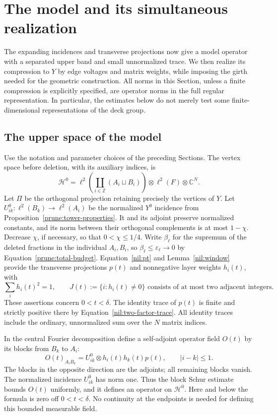 \section{The model and its simultaneous realization}
\label{sam:section}

The expanding incidences and transverse projections now give a model
operator with a separated upper band and small unnormalized trace.
We then realize its compression to \(Y\) by edge voltages and matrix
weights, while imposing the girth needed for the geometric construction.
All norms in this Section, unless a finite compression is explicitly
specified, are operator norms in the full regular representation.  In
particular, the estimates below do not merely test some finite-dimensional
representations of the deck group.

\subsection{The upper space of the model}

Use the notation and parameter choices of the preceding Sections.  The
vertex space before deletion, with its auxiliary indices, is
\[
 \mathcal H^0=
 \ell^2\!\left(\coprod_{i\in\mathbb Z}(A_i\sqcup B_i)\right)
 \otimes\ell^2(F)\otimes\mathbb C^N.
\]
Let \(\Pi\) be the orthogonal projection retaining precisely the vertices
of \(Y\).  Let \(U^0_{ik}:\ell^2(B_k)\to\ell^2(A_i)\) be the
normalized \(Y^0\) incidence from Proposition~\ref{prune:tower-properties}.
It and its adjoint preserve normalized constants, and its norm between
their orthogonal complements is at most \(1-\chi\). Decrease \(\chi\),
if necessary, so that \(0<\chi\le1/4\). Write \(\beta_\ell\) for the
supremum of the deleted fractions in the individual \(A_i,B_i\), so
\(\beta_\ell\le\varepsilon_\ell\to0\) by
Equation~\eqref{prune:total-budget}.
Equation~\eqref{nil:pt} and Lemma~\ref{nil:window} provide the transverse
projections \(p(t)\) and nonnegative layer weights \(h_i(t)\), with
\begin{equation}
 \sum_i h_i(t)^2=1,\qquad
 J(t):=\{i:h_i(t)\ne0\}\text{ consists of at most two adjacent integers}.
 \label{spec:active-layers}
\end{equation}
These assertions concern \(0<t<\delta\). The identity trace of \(p(t)\)
is finite and strictly positive there by
Equation~\eqref{nil:two-factor-trace}. All identity traces include the
ordinary, unnormalized sum over the \(N\) matrix indices.

In the central Fourier decomposition define a self-adjoint
operator field \(O(t)\) by its blocks from \(B_k\) to \(A_i\):
\begin{equation}\label{sam:model}
 O(t)_{A_iB_k}=U^0_{ik}\otimes h_i(t)h_k(t)p(t),
 \qquad |i-k|\le1.
\end{equation}
The blocks in the opposite direction are the adjoints; all remaining
blocks vanish.  The normalized incidence \(U^0_{ik}\) has norm one.
Thus the block Schur estimate bounds \(O(t)\) uniformly, and it defines
an operator on \(\mathcal H^0\).  Here and below the formula is zero off
\(0<t<\delta\).  No continuity at the endpoints is needed for defining
this bounded measurable field.


